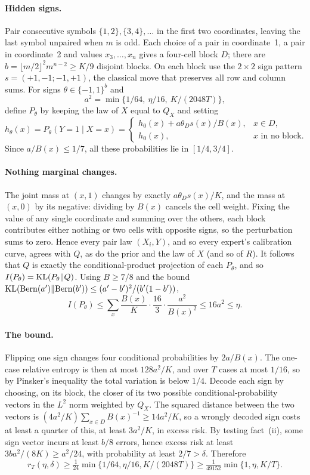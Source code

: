 \documentclass[11pt,a4paper]{article}
\theoremstyle{remark}
\newcommand{\KL}{\mathop{\rm KL}\nolimits}
\begin{document}
\paragraph{Hidden signs.} Pair consecutive symbols $\{1,2\},\{3,4\},\ldots$ in the first two coordinates, leaving the last symbol unpaired when $m$ is odd. Each choice of a pair in coordinate~1, a pair in coordinate~2 and values $x_3,\ldots,x_n$ gives a four-cell block $D$; there are $b=\lfloor m/2\rfloor^2m^{n-2}\ge K/9$ disjoint blocks. On each block use the $2\times2$ sign pattern $s=(+1,-1;-1,+1)$, the classical move that preserves all row and column sums. For signs $\theta\in\{-1,1\}^b$ and
\[
a^2=\min\{1/64,\ \eta/16,\ K/(2048T)\},
\]
define $P_\theta$ by keeping the law of $X$ equal to $Q_X$ and setting
\[
 h_\theta(x)=P_\theta(Y=1\mid X=x)=
 \begin{cases}
 h_0(x)+a\theta_D s(x)/B(x),&x\in D,\\
 h_0(x),&x\text{ in no block}.
 \end{cases}
\]
Since $a/B(x)\le1/7$, all these probabilities lie in $[1/4,3/4]$.

\paragraph{Nothing marginal changes.} The joint mass at $(x,1)$ changes by exactly $a\theta_Ds(x)/K$, and the mass at $(x,0)$ by its negative: dividing by $B(x)$ cancels the cell weight. Fixing the value of any single coordinate and summing over the others, each block contributes either nothing or two cells with opposite signs, so the perturbation sums to zero. Hence every pair law $(X_i,Y)$, and so every expert's calibration curve, agrees with $Q$, as do the prior and the law of $X$ (and so of $R$). It follows that $Q$ is exactly the conditional-product projection of each $P_\theta$, and so $I(P_\theta)=\KL(P_\theta\|Q)$. Using $B\ge7/8$ and the bound $\KL(\mathrm{Bern}(a')\|\mathrm{Bern}(b'))\le(a'-b')^2/(b'(1-b'))$,
\[
 I(P_\theta)
 \le \sum_{x}\frac{B(x)}{K}\cdot\frac{16}{3}\cdot\frac{a^2}{B(x)^2}
 \le16a^2\le\eta.
\]

\paragraph{The bound.} Flipping one sign changes four conditional probabilities by $2a/B(x)$. The one-case relative entropy is then at most $128a^2/K$, and over $T$ cases at most $1/16$, so by Pinsker's inequality the total variation is below $1/4$. Decode each sign by choosing, on its block, the closer of its two possible conditional-probability vectors in the $L^2$ norm weighted by $Q_X$. The squared distance between the two vectors is $(4a^2/K)\sum_{x\in D}B(x)^{-1}\ge14a^2/K$, so a wrongly decoded sign costs at least a quarter of this, at least $3a^2/K$, in excess risk. By testing fact~(ii), some sign vector incurs at least $b/8$ errors, hence excess risk at least $3ba^2/(8K)\ge a^2/24$, with probability at least $2/7>\delta$. Therefore
\[
 r_T(\eta,\delta)\ge \tfrac{1}{24}\min\{1/64,\eta/16,K/(2048T)\}\ge\tfrac{1}{49152}\min\{1,\eta,K/T\}.
\]
\end{document}
